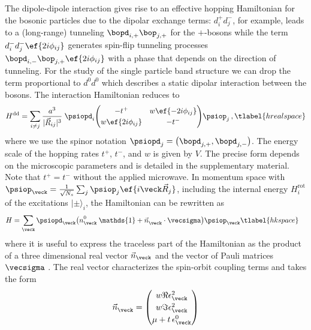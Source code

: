 The dipole-dipole interaction gives rise to an effective hopping Hamiltonian for the bosonic particles due to the dipolar exchange terms:
$d^+_id^-_j$, for example, leads to a (long-range) tunneling $\bopd_{i,+}\bop_{j,+}$ for the ${+}$-bosons while the term $d^-_i d^-_j \ef{2i\phi_{i j}}$ generates spin-flip tunneling processes $\bopd_{i,-}\bop_{j,+} \ef{2i\phi_{ij}}$ with a phase that depends on the direction of tunneling.
For the study of the single particle band structure we can drop the term proportional to $d^0 d^0$ which describes a static dipolar interaction between the bosons.
The interaction Hamiltonian reduces to
\begin{align}
    H^{\text{dd}} = \sum_{i\ne j}
    \frac{a^3}{|\vec{R}_{ij}|^3}\;
    \psiopd_i\!
    \begingroup
        \renewcommand*{\arraystretch}{1.2}
        \begin{pmatrix}
            -t^+ & w \ef{-2i\phi_{ij}} \\
            w \ef{2i\phi_{ij}} & -t^-
        \end{pmatrix}
    \endgroup\!
    \psiop_j \,,
    \tlabel{hrealspace}
\end{align}
where we use the spinor notation $\psiopd_j = \big( \bopd_{j,+} , \bopd_{j,-} \big)$.
The energy scale of the hopping rates $t^+$, $t^-$, and $w$ is given by $V$. The precise form depends on the microscopic parameters and is detailed in the supplementary material.
Note that $t^{+} = t^{-}$ without the applied microwave.
In momentum space with $\psiop_{\veck}=\frac{1}{\sqrt{N_s}}\sum_{j} \psiop_{j}\ef{i\veck\vec{R}_j}$, including the internal energy $H_{i}^{\text{rot}}$ of the excitations $|\pm\rangle_{i}$, the Hamiltonian can be rewritten as
\begin{align}
    H &= \sum_{\veck} \psiopd_{\veck} \big({n^{0\vphantom\dagger}_{\veck} \: \mathds{1} + \vec{n}^{\vphantom \dagger}_{\veck}\cdot\vecsigma}\big) \psiop_{\veck}
    \tlabel{hkspace}
\end{align}
where it is useful to express the traceless part of the Hamiltonian
as the product of a three dimensional real vector $\vec{n}_{\veck}$ and the vector of Pauli matrices $\vecsigma$ \cite{Hasan2010,Bernevig2013}.
The real vector characterizes the spin-orbit coupling terms and takes the form
\begin{align}
    \vec{n}^{\vphantom 0}_{\veck} = \begin{pmatrix}
        w \Re \epsilon^2_{\veck} \\
        w \Im \epsilon^2_{\veck} \\
        \mu + t\, \epsilon^0_{\veck}
    \end{pmatrix}
\end{align}
